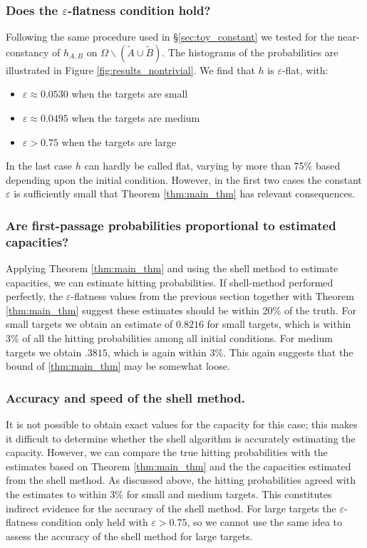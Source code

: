 \documentclass[12pt, nofootinbib,english, amsmath, amssymb, aps, priprint, graphicx,floatfix]{revtex4-1}
\theoremstyle{plain}
\theoremstyle{definition}
\theoremstyle{plain}
\newcommand{\tA}{{\tilde A}}
\newcommand{\tB}{{\tilde B}}
\begin{document}
\subsubsection{Does the $\varepsilon$-flatness condition hold?}
Following the same procedure used in \S\ref{sec:toy_constant} we tested for the near-constancy of $h_{A,B}$ on $\Omega\backslash(\tA\cup\tB)$. The histograms of the probabilities are illustrated in Figure \ref{fig:results_nontrivial}. We find that $h$ is $\varepsilon$-flat, with:
\begin{itemize}
    \item $\varepsilon\approx 0.0530$ when the targets are small
    \item $\varepsilon\approx 0.0495$ when the targets are medium
    \item $\varepsilon> 0.75$ when the targets are large
\end{itemize}
In the last case $h$ can hardly be called flat, varying by more than 75\% based depending upon the initial condition.  However, in the first two cases the constant $\varepsilon$ is sufficiently small that Theorem \ref{thm:main_thm} has relevant consequences.

\subsubsection{Are first-passage probabilities proportional to estimated capacities?}
Applying Theorem \ref{thm:main_thm} and using the shell method to estimate capacities, we can estimate hitting probabilities.  If shell-method performed perfectly, the $\varepsilon$-flatness values from the previous section together with Theorem \ref{thm:main_thm} suggest these estimates should be within 20\% of the truth.  For small targets we obtain an estimate of $0.8216$ for small targets, which is within 3\% of all the hitting probabilities among all initial conditions.  For medium targets we obtain $.3815$, which is again within 3\%.  This again suggests that the bound of \ref{thm:main_thm} may be somewhat loose.

\subsubsection{Accuracy and speed of the shell method.}

It is not possible to obtain exact values for the capacity for this case; this makes it difficult to determine whether the shell algorithm is accurately estimating the capacity.  However, we can compare the true hitting probabilities with the estimates based on Theorem \ref{thm:main_thm} and the the capacities estimated from the shell method.  As discussed above, the hitting probabilities agreed with the estimates to within 3\% for small and medium targets.  This constitutes indirect evidence for the accuracy of the shell method.  For large targets the $\varepsilon$-flatness condition only held with $\varepsilon>0.75$, so we cannot use the same idea to assess the accuracy of the shell method for large targets. 
\end{document}
